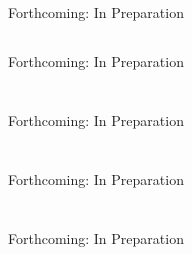 \documentclass{report}
\begin{document}
% 
\chapter{}
Forthcoming: In Preparation

% 
\chapter{}
Forthcoming: In Preparation

%
\part{}
Forthcoming: In Preparation

%
\part{}
Forthcoming: In Preparation

%
\part{}
Forthcoming: In Preparation
\end{document}
